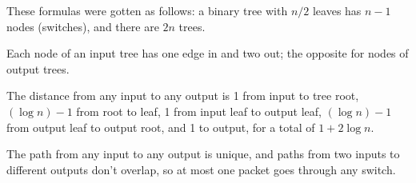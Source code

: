 \documentclass[12pt,twoside]{article}
\begin{document}
\begin{problem}{10}
{

These formulas were gotten as follows: a binary tree with $n/2$ leaves has
$n-1$ nodes (switches), and there are $2n$ trees.

Each node of an input tree has one edge in and two out; the opposite
for nodes of output trees.

The distance from any input to any output is 1 from input to tree root,
$(\log n)-1$ from root to leaf, 1 from input leaf to output leaf, $(\log
n)-1$ from output leaf to output root, and 1 to output, for a total of $1+
2\log n$.

The path from any input to any output is unique, and paths from two inputs
to different outputs don't overlap, so at most one packet goes through any
switch.
}

\eparts

\end{problem}


\newpage

\end{document}
